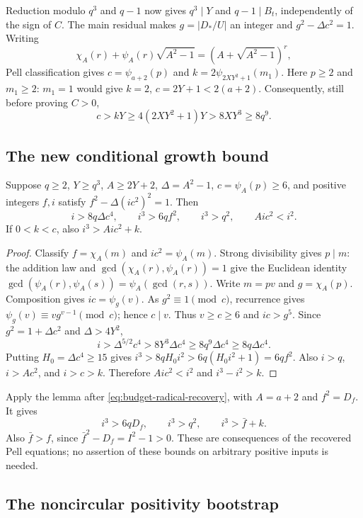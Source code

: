 Reduction modulo $q^3$ and $q-1$ now gives $q^3\mid Y$ and
$q-1\mid B_t$, independently of the sign of $C$.
The main residual makes $g=|D_*/U|$ an integer and
$g^2-\Delta c^2=1$.  Writing
\[
 \chi_A(r)+\psi_A(r)\sqrt{A^2-1}
       =(A+\sqrt{A^2-1})^r,
\]
Pell classification gives $c=\psi_{a+2}(p)$ and
$k=2\psi_{2XY^2+1}(m_1)$.  Here $p\ge2$ and $m_1\ge2$:
$m_1=1$ would give $k=2$, $c=2Y+1<2(a+2)$.
Consequently, still before proving $C>0$,
\begin{equation}
 c>kY\ge4(2XY^2+1)Y>8XY^3\ge8q^9.
 \label{eq:budget-c-growth}
\end{equation}

\subsection{The new conditional growth bound}

\begin{lemma}
Suppose $q\ge2$, $Y\ge q^3$, $A\ge2Y+2$,
$\Delta=A^2-1$, $c=\psi_A(p)\ge6$, and positive integers $f,i$
satisfy $f^2-\Delta(ic^2)^2=1$.  Then
\[
 i>8q\Delta c^4,\qquad i^3>6qf^2,\qquad i^3>q^2,
 \qquad Aic^2<i^2.
\]
If $0<k<c$, also $i^3>Aic^2+k$.
\end{lemma}
\begin{proof}
Classify $f=\chi_A(m)$ and $ic^2=\psi_A(m)$.
Strong divisibility gives $p\mid m$: the addition law and
$\gcd(\chi_A(r),\psi_A(r))=1$ give the Euclidean identity
$\gcd(\psi_A(r),\psi_A(s))=\psi_A(\gcd(r,s))$.
Write $m=pv$ and $g=\chi_A(p)$.  Composition gives
$ic=\psi_g(v)$.  As $g^2\equiv1\pmod c$, recurrence gives
$\psi_g(v)\equiv vg^{v-1}\pmod c$; hence $c\mid v$.
Thus $v\ge c\ge6$ and $ic>g^5$.  Since
$g^2=1+\Delta c^2$ and $\Delta>4Y^2$,
\[
 i>\Delta^{5/2}c^4
   >8Y^3\Delta c^4\ge8q^9\Delta c^4\ge8q\Delta c^4.
\]
Putting $H_0=\Delta c^4\ge15$ gives
$i^3>8qH_0i^2>6q(H_0i^2+1)=6qf^2$.
Also $i>q$, $i>Ac^2$, and $i>c>k$.
Therefore $Aic^2<i^2$ and $i^3-i^2>k$.
\end{proof}

Apply the lemma after \eqref{eq:budget-radical-recovery}, with
$A=a+2$ and $f^2=D_f$.  It gives
\begin{equation}
 i^3>6qD_f,\qquad i^3>q^2,\qquad i^3>\bar f+k.
 \label{eq:budget-bounds}
\end{equation}
Also $\bar f>f$, since $\bar f^2-D_f=I^2-1>0$.
These are consequences of the recovered Pell equations; no assertion
of these bounds on arbitrary positive inputs is needed.

\subsection{The noncircular positivity bootstrap}


